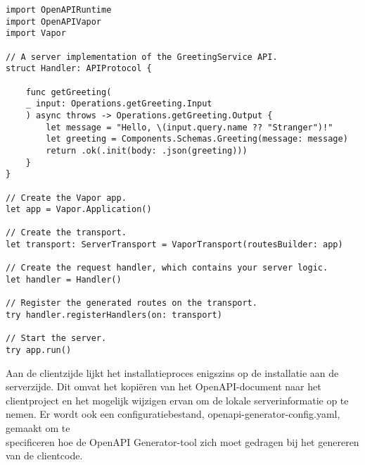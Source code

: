 \begin{lstlisting}[caption=Using generated API Server Stubs]
import OpenAPIRuntime
import OpenAPIVapor
import Vapor

// A server implementation of the GreetingService API.
struct Handler: APIProtocol {
    
    func getGreeting(
    _ input: Operations.getGreeting.Input
    ) async throws -> Operations.getGreeting.Output {
        let message = "Hello, \(input.query.name ?? "Stranger")!"
        let greeting = Components.Schemas.Greeting(message: message)
        return .ok(.init(body: .json(greeting)))
    }
}

// Create the Vapor app.
let app = Vapor.Application()

// Create the transport.
let transport: ServerTransport = VaporTransport(routesBuilder: app)

// Create the request handler, which contains your server logic.
let handler = Handler()

// Register the generated routes on the transport.
try handler.registerHandlers(on: transport)

// Start the server.
try app.run()
\end{lstlisting}

Aan de clientzijde lijkt het installatieproces enigszins op de installatie aan de serverzijde. Dit omvat het kopiëren van het OpenAPI-document naar het clientproject en het mogelijk wijzigen ervan om de lokale serverinformatie op te nemen. Er wordt ook een configuratiebestand, openapi-generator-config.yaml, gemaakt om te \\specificeren hoe de OpenAPI Generator-tool zich moet gedragen bij het genereren van de clientcode.

